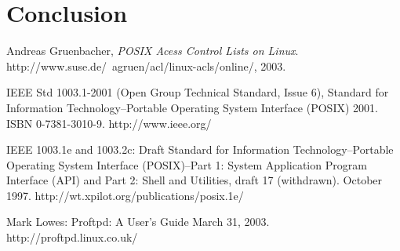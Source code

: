 \documentclass[draft]{article}
\begin{document}
% 
% 
% 
% 
% 
% 



\section*{Conclusion}

\begin{thebibliography}{9}


 
  Andreas Gruenbacher,
  \emph{POSIX Acess Control Lists on Linux}.
  http://www.suse.de/~agruen/acl/linux-acls/online/,
  2003.

    IEEE Std 1003.1-2001 (Open Group Technical Standard, Issue 6), 
	Standard for Information Technology--Portable Operating System Interface (POSIX) 2001. 
	ISBN 0-7381-3010-9. 
	http://www.ieee.org/

    IEEE 1003.1e and 1003.2c: Draft Standard for Information Technology--Portable Operating System Interface (POSIX)--Part 1: System Application Program Interface (API) and Part 2: Shell and Utilities, draft 17 (withdrawn). 
	October 1997. 
	http://wt.xpilot.org/publications/posix.1e/

	Mark Lowes: 
	Proftpd: 
	A User's Guide March 31, 2003. 
	http://proftpd.linux.co.uk/

\end{thebibliography}


\end{document}
